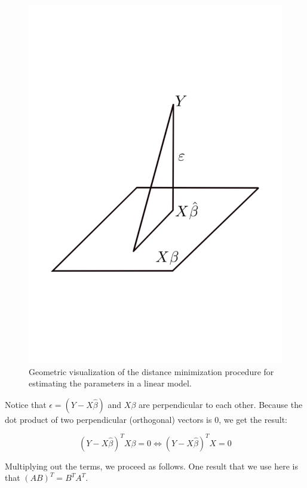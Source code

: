 \documentclass[
  12pt,
]{krantz}
\theoremstyle{definition}
\theoremstyle{definition}
\theoremstyle{definition}
\theoremstyle{definition}
\theoremstyle{remark}
\begin{document}
\begin{figure}
\centering
\includegraphics{figures/leastsq.pdf}
\caption{\label{fig:leastsquares}Geometric visualization of the distance minimization procedure for estimating the parameters in a linear model.}
\end{figure}

Notice that \(\epsilon=(Y - X\hat\beta)\) and \(X\beta\) are perpendicular to each other. Because the dot product of two perpendicular (orthogonal) vectors is 0, we get the result:

\begin{equation}
(Y- X\hat\beta)^T X \beta = 0 \Leftrightarrow (Y- X\hat\beta)^T X = 0 
\end{equation}

Multiplying out the terms, we proceed as follows. One result that we use here is that \((AB)^T = B^T A^T\).
\end{document}
